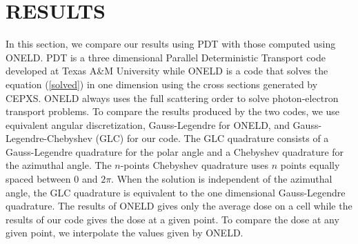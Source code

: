 \section{RESULTS}
In this section, we compare our results using PDT with those computed using
ONELD\cite{cepxs}. PDT is a three dimensional Parallel Deterministic Transport code developed at
Texas A\&M University while ONELD is a code that solves the  
equation (\ref{solved}) in one dimension using the cross sections generated by
CEPXS. ONELD always uses the full scattering order to solve photon-electron
transport problems. To compare the results produced by the two codes, we use 
equivalent angular discretization, Gauss-Legendre for ONELD, and 
Gauss-Legendre-Chebyshev (GLC) for our code. The GLC quadrature consists of 
a Gauss-Legendre quadrature for the polar angle and a Chebyshev quadrature 
for the azimuthal angle. The $n$-points Chebyshev quadrature uses $n$ points 
equally spaced between 0 and $2\pi$. When the solution is independent of the 
azimuthal angle, the GLC quadrature is equivalent to the one dimensional 
Gauss-Legendre quadrature. The results of ONELD gives only the average dose 
on a cell while the results of our code gives the dose at a given point. To 
compare the dose at any given point, we interpolate the values given by ONELD.


